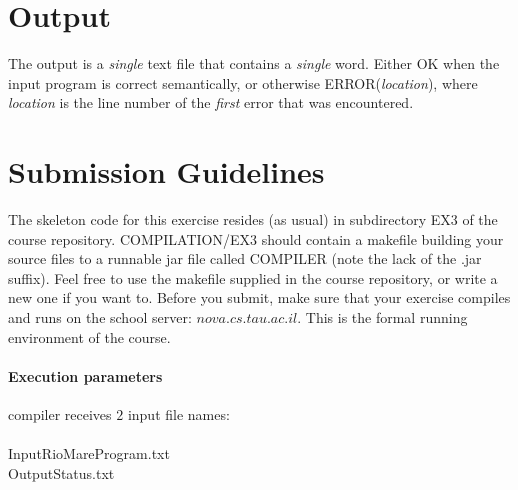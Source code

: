 \documentclass{article}
\begin{document}
\section{Output}
The output is a \textit{single} text file that contains a \textit{single} word.
Either OK when the input program is correct semantically,
or otherwise ERROR(\textit{location}), where \textit{location}
is the line number of the \textit{first} error that was encountered.

\section{Submission Guidelines}
The skeleton code for this exercise resides (as usual)
in subdirectory EX3 of the course repository.
COMPILATION/EX3 should contain a makefile building your source files to a
runnable jar file called COMPILER (note the lack of the .jar suffix).
Feel free to use the makefile supplied in the course repository,
or write a new one if you want to. 
Before you submit, make sure that your exercise compiles and runs
on the school server: $nova.cs.tau.ac.il$.
This is the formal running environment of the course.
\
\paragraph{Execution parameters}
compiler receives $2$ input file names:\\ \\
InputRioMareProgram.txt\\
OutputStatus.txt
\end{document}
